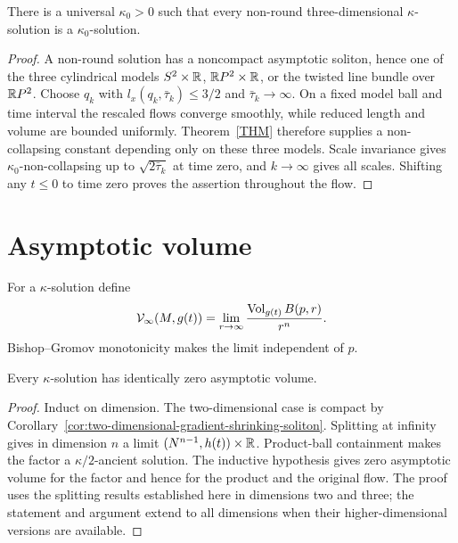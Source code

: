 \begin{proposition}\label{prop:universal-kappa-non-round}
\label{kappa0}

There is a universal $\kappa_0>0$ such that every non-round
three-dimensional $\kappa$-solution is a $\kappa_0$-solution.
\end{proposition}
\begin{proof}
\sketch
{}
A non-round solution has a noncompact asymptotic soliton, hence one
of the three cylindrical models $S^2\times\mathbb{R}$,
$\mathbb{R} P^2\times\mathbb{R}$, or the twisted line bundle over $\mathbb{R} P^2$.
Choose $q_k$ with $l_x(q_k,\bar\tau_k)\leq3/2$ and
$\bar\tau_k\to\infty$. On a fixed model ball and time interval the
rescaled flows converge smoothly, while reduced length and volume
are bounded uniformly. Theorem~\ref{THM} therefore supplies a
non-collapsing constant depending only on these three models. Scale
invariance gives $\kappa_0$-non-collapsing up to
$\sqrt{2\bar\tau_k}$ at time zero, and $k\to\infty$ gives all
scales. Shifting any $t\leq0$ to time zero proves the assertion
throughout the flow.
\end{proof}

\section{Asymptotic volume}

For a $\kappa$-solution define
\[
 \mathcal V_\infty(M,g(t))
 =\lim_{r\to\infty}\frac{\operatorname{Vol}_{g(t)}B(p,r)}{r^n}.
\]
Bishop--Gromov monotonicity makes the limit independent of $p$.

\begin{theorem}\label{thm:asymptotic-volume-zero}
\label{asympvol}

Every $\kappa$-solution has identically zero asymptotic volume.
\end{theorem}
\begin{proof}
\sketch
{}
Induct on dimension. The two-dimensional case is compact by
Corollary~\ref{cor:two-dimensional-gradient-shrinking-soliton}.
Splitting at infinity gives in dimension $n$ a limit
$(N^{n-1},h(t))\times\mathbb{R}$. Product-ball containment makes the
factor a $\kappa/2$-ancient solution. The inductive hypothesis gives
zero asymptotic volume for the factor and hence for the product and
the original flow. The proof uses the splitting results established
here in dimensions two and three; the statement and argument extend
to all dimensions when their higher-dimensional versions are
available.
\end{proof}

